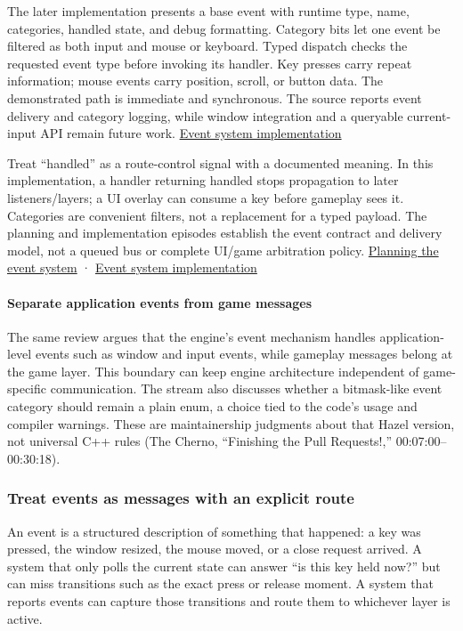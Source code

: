 The later implementation presents a base event with runtime type, name, categories, handled state, and debug formatting. Category bits let one event be filtered as both input and mouse or keyboard. Typed dispatch checks the requested event type before invoking its handler. Key presses carry repeat information; mouse events carry position, scroll, or button data. The demonstrated path is immediate and synchronous. The source reports event delivery and category logging, while window integration and a queryable current-input API remain future work. \href{https://www.youtube.com/watch?v=xnopUoZbMEk}{Event system implementation}

Treat ``handled'' as a route-control signal with a documented meaning. In this implementation, a handler returning handled stops propagation to later listeners/layers; a UI overlay can consume a key before gameplay sees it. Categories are convenient filters, not a replacement for a typed payload. The planning and implementation episodes establish the event contract and delivery model, not a queued bus or complete UI/game arbitration policy. \href{https://www.youtube.com/watch?v=5mlziHwq90k}{Planning the event system} · \href{https://www.youtube.com/watch?v=xnopUoZbMEk}{Event system implementation}

\paragraph{Separate application events from game messages}\label{separate-application-events-from-game-messages}

The same review argues that the engine's event mechanism handles application-level events such as window and input events, while gameplay messages belong at the game layer. This boundary can keep engine architecture independent of game-specific communication. The stream also discusses whether a bitmask-like event category should remain a plain enum, a choice tied to the code's usage and compiler warnings. These are maintainership judgments about that Hazel version, not universal C++ rules (The Cherno, ``Finishing the Pull Requests!,'' 00:07:00--00:30:18).

\subsubsection{Treat events as messages with an explicit route}\label{treat-events-as-messages-with-an-explicit-route}

An event is a structured description of something that happened: a key was pressed, the window resized, the mouse moved, or a close request arrived. A system that only polls the current state can answer ``is this key held now?'' but can miss transitions such as the exact press or release moment. A system that reports events can capture those transitions and route them to whichever layer is active.

